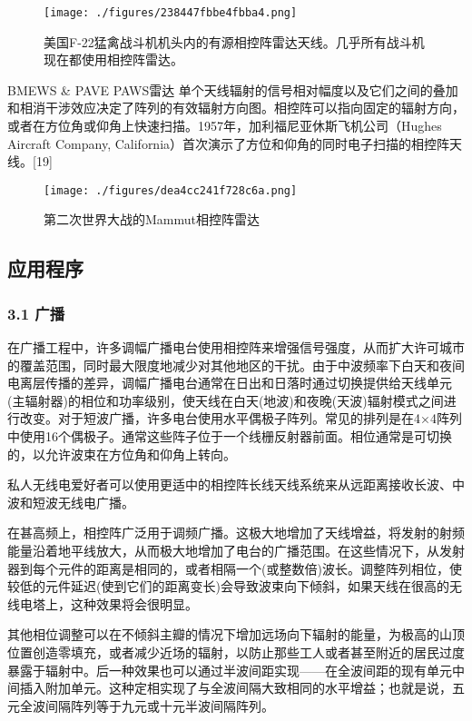 \begin{figure}[ht]
\centering
\texttt{[image: ./figures/238447fbbe4fbba4.png]}
\caption{美国F-22猛禽战斗机机头内的有源相控阵雷达天线。几乎所有战斗机现在都使用相控阵雷达。} \label{fig_XKZ_6}
\end{figure}
BMEWS & PAVE PAWS雷达
单个天线辐射的信号相对幅度以及它们之间的叠加和相消干涉效应决定了阵列的有效辐射方向图。相控阵可以指向固定的辐射方向，或者在方位角或仰角上快速扫描。1957年，加利福尼亚休斯飞机公司（Hughes Aircraft Company, California）首次演示了方位和仰角的同时电子扫描的相控阵天线。[19]
\begin{figure}[ht]
\centering
\texttt{[image: ./figures/dea4cc241f728c6a.png]}
\caption{第二次世界大战的Mammut相控阵雷达} \label{fig_XKZ_7}
\end{figure}

\subsection{ 应用程序}
\subsubsection{3.1 广播}
在广播工程中，许多调幅广播电台使用相控阵来增强信号强度，从而扩大许可城市的覆盖范围，同时最大限度地减少对其他地区的干扰。由于中波频率下白天和夜间电离层传播的差异，调幅广播电台通常在日出和日落时通过切换提供给天线单元(主辐射器)的相位和功率级别，使天线在白天(地波)和夜晚(天波)辐射模式之间进行改变。对于短波广播，许多电台使用水平偶极子阵列。常见的排列是在4×4阵列中使用16个偶极子。通常这些阵子位于一个线栅反射器前面。相位通常是可切换的，以允许波束在方位角和仰角上转向。

私人无线电爱好者可以使用更适中的相控阵长线天线系统来从远距离接收长波、中波和短波无线电广播。

在甚高频上，相控阵广泛用于调频广播。这极大地增加了天线增益，将发射的射频能量沿着地平线放大，从而极大地增加了电台的广播范围。在这些情况下，从发射器到每个元件的距离是相同的，或者相隔一个(或整数倍)波长。调整阵列相位，使较低的元件延迟(使到它们的距离变长)会导致波束向下倾斜，如果天线在很高的无线电塔上，这种效果将会很明显。

其他相位调整可以在不倾斜主瓣的情况下增加远场向下辐射的能量，为极高的山顶位置创造零填充，或者减少近场的辐射，以防止那些工人或者甚至附近的居民过度暴露于辐射中。后一种效果也可以通过半波间距实现——在全波间距的现有单元中间插入附加单元。这种定相实现了与全波间隔大致相同的水平增益；也就是说，五元全波间隔阵列等于九元或十元半波间隔阵列。

